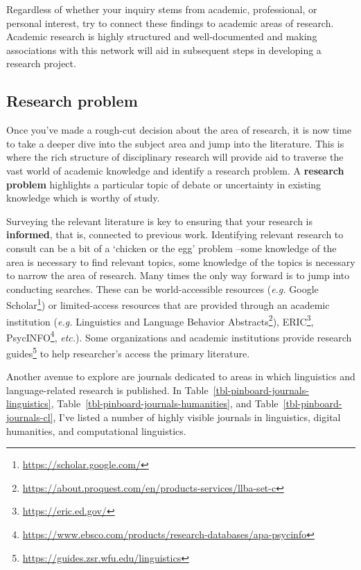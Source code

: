 \documentclass[
  letterpaper,
  DIV=11,
  numbers=noendperiod]{scrreport}
\theoremstyle{definition}
\theoremstyle{remark}
\DeclareRobustCommand{\href}[2]{#2\footnote{\url{#1}}}
\begin{document}
Regardless of whether your inquiry stems from academic, professional, or
personal interest, try to connect these findings to academic areas of
research. Academic research is highly structured and well-documented and
making associations with this network will aid in subsequent steps in
developing a research project.

\hypertarget{sec-fr-problem}{%
\subsection{Research problem}\label{sec-fr-problem}}

Once you've made a rough-cut decision about the area of research, it is
now time to take a deeper dive into the subject area and jump into the
literature. This is where the rich structure of disciplinary research
will provide aid to traverse the vast world of academic knowledge and
identify a research problem. A \textbf{research problem} highlights a
particular topic of debate or uncertainty in existing knowledge which is
worthy of study.

Surveying the relevant literature is key to ensuring that your research
is \textbf{informed}, that is, connected to previous work. Identifying
relevant research to consult can be a bit of a `chicken or the egg'
problem --some knowledge of the area is necessary to find relevant
topics, some knowledge of the topics is necessary to narrow the area of
research. Many times the only way forward is to jump into conducting
searches. These can be world-accessible resources (\emph{e.g.}
\href{https://scholar.google.com/}{Google Scholar}) or limited-access
resources that are provided through an academic institution (\emph{e.g.}
\href{https://about.proquest.com/en/products-services/llba-set-c}{Linguistics
and Language Behavior Abstracts}), \href{https://eric.ed.gov/}{ERIC},
\href{https://www.ebsco.com/products/research-databases/apa-psycinfo}{PsycINFO},
\emph{etc.}). Some organizations and academic institutions provide
\href{https://guides.zsr.wfu.edu/linguistics}{research guides} to help
researcher's access the primary literature.

Another avenue to explore are journals dedicated to areas in which
linguistics and language-related research is published. In
Table~\ref{tbl-pinboard-journals-linguistics},
Table~\ref{tbl-pinboard-journals-humanities}, and
Table~\ref{tbl-pinboard-journals-cl}, I've listed a number of highly
visible journals in linguistics, digital humanities, and computational
linguistics.
\end{document}
